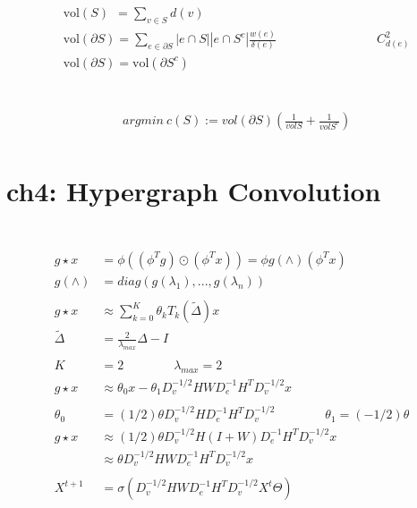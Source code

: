 \documentclass{article}
\begin{document}
%
\begin{align*}
    & \text{vol}(S) \ \ = \sum_{v \in S} d(v)  \\[3pt]
    & \text{vol}(\partial S) = \sum_{e \in \partial S} 
      |e \cap S||e \cap S^{c}| \frac{w(e)}{\delta (e)} 
      \qquad \qquad \qquad \qquad C_{d(e)}^{2}  \\[3pt]
    & \text{vol}(\partial S) = \text{vol}(\partial S^{c})  \\[3pt]
\end{align*}


~ \\[3pt]
%
\begin{align*}
    & argmin \ c(S) := vol(\partial S) (\frac{1}{volS} + \frac{1}{volS^{c}})  \\[3pt]
\end{align*}


\newpage
\section*{ch4: Hypergraph Convolution}


~ \\[3pt]
%
\begin{align*}
    ~ \\[3pt]
    g \star x &= \phi ( (\phi^{T} g) \odot (\phi^{T} x) ) 
              = \phi g(\wedge) (\phi^{T} x)  \\[3pt]
    g(\wedge) &= diag( g(\lambda_{1}), ..., g(\lambda_{n}) )  \\[3pt]
    ~ \\[3pt]
    g \star x & \approx \sum_{k=0}^{K} \theta_{k} T_{k} ( \tilde{\Delta} ) x  \\[3pt]
    \tilde{\Delta} & = \frac{2}{\lambda_{max}} \Delta - I  \\[3pt]
    ~ \\[3pt]
    K & = 2  \qquad \qquad \lambda_{max} = 2  \\[3pt]
    g \star x & \approx \theta_{0}x - \theta_{1} 
        D_{v}^{-1/2} H W D_{e}^{-1} H^{T} D_{v}^{-1/2} x  \\[3pt]
    ~ \\[3pt]
    \theta_{0} &= (1/2) \theta D_{v}^{-1/2} H D_{e}^{-1} H^{T} D_{v}^{-1/2} \qquad \qquad 
    \theta_{1} = (-1/2) \theta  \\[3pt]
    g \star x & \approx (1/2) \theta D_{v}^{-1/2} H (I+W) D_{e}^{-1} H^{T} D_{v}^{-1/2} x  \\[3pt]
              & \approx \theta D_{v}^{-1/2} H W D_{e}^{-1} H^{T} D_{v}^{-1/2} x  \\[3pt]
    ~ \\[3pt]
    X^{t+1} &= \sigma ( D_{v}^{-1/2} H W D_{e}^{-1} H^{T} D_{v}^{-1/2} X^{t} \varTheta )  \\[3pt]
\end{align*}
\end{document}
